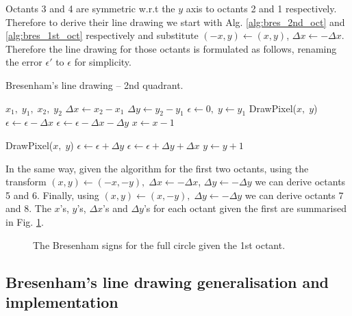 \documentclass[a4paper]{article}
\begin{document}
Octants 3 and 4 are symmetric w.r.t the $y$ axis to octants 2 and 1 respectively. Therefore to derive their line drawing we start with Alg. \ref{alg:bres_2nd_oct} and \ref{alg:bres_1st_oct} respectively and substitute $(-x,y) \leftarrow (x,y)$, $\Delta x \leftarrow -\Delta x$. Therefore the line drawing for those octants is formulated as follows, renaming the error $\epsilon'$ to $\epsilon$ for simplicity.
\begin{algorithm}[H]
\caption{Bresenham's line drawing -- 2nd quadrant.}
\label{alg:bres_2nd_qd}
\begin{algorithmic}[1]
 {$x_1,\; y_1,\; x_2,\; y_2$} 
	\State $\Delta x \leftarrow x_2 - x_1$
	\State $\Delta y \leftarrow y_2 - y_1$
	\State $\epsilon \leftarrow 0, \; y\leftarrow y_1$ 
	 
			\State DrawPixel($x,\; y$)
				\State $\epsilon \leftarrow \epsilon - \Delta x$ 
			\Else
				\State $\epsilon \leftarrow \epsilon - \Delta x - \Delta y$ 
				\State $x\leftarrow x - 1$
			\EndIf
		\EndFor
	 
			
			\State DrawPixel($x,\; y$)
				\State $\epsilon \leftarrow \epsilon + \Delta y$
			\Else
				\State $\epsilon \leftarrow \epsilon + \Delta y + \Delta x$ 
				\State $y\leftarrow y + 1$
			\EndIf
	    \EndFor	
	\EndIf
\EndProcedure
\end{algorithmic}
\end{algorithm}
In the same way, given the algorithm for the first two octants, using the transform $(x,y) \leftarrow (-x,-y), \; \Delta x \leftarrow -\Delta x$, $\Delta y \leftarrow -\Delta y$ we can derive octants 5 and 6. Finally, using $(x,y) \leftarrow (x,-y), \; \Delta y \leftarrow -\Delta y$ we can derive octants 7 and 8. The $x$'s, $y$'s, $\Delta x$'s and $\Delta y$'s for each octant given the first are summarised in Fig. \ref{fig:all_octants_x_y}.

\begin{figure}[H]
	\centering
	
	\caption{The Bresenham signs for the full circle given the 1st octant.}
	\label{fig:all_octants_x_y}
\end{figure}


\subsection{Bresenham's line drawing generalisation and implementation}
\end{document}
